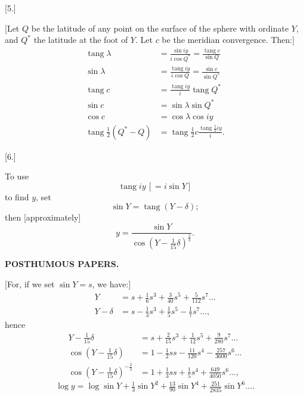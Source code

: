 \begin{center}[5.]\end{center}
[Let \(Q\) be the latitude of any point on the surface of the sphere
with ordinate \(Y\), and \(Q^{*}\) the latitude at the foot of \(Y\).
Let \(c\) be the meridian convergence. Then:]
\[
\begin{aligned}
\operatorname{tang}\lambda&=\frac{\sin iy}{i\cos Q^{*}}=\frac{\operatorname{tang}c}{\sin Q}\\
\sin\lambda&=\frac{\operatorname{tang}iy}{i\cos Q}=\frac{\sin c}{\sin Q^{*}}\\
\operatorname{tang}c&=\frac{\operatorname{tang}iy}{i}\operatorname{tang} Q^{*}\\
\sin c&=\sin\lambda\sin Q^{*}\\
\cos c&=\cos\lambda\cos iy\\
\operatorname{tang}\tfrac12(Q^{*}-Q)&=\operatorname{tang}\tfrac12c
 \frac{\operatorname{tang}\tfrac12iy}{i}.
\end{aligned}
\]

\begin{center}[6.]\end{center}
To use
\[
\operatorname{tang}iy\,[=i\sin Y]
\]
\noindent to find \(y\), set
\[
\sin Y=\operatorname{tang}(Y-\delta);
\]
\noindent then [approximately]
\[
y=\frac{\sin Y}{\cos(Y-\tfrac1{15}\delta)^{\frac23}}.
\]

\par\clearpage
\noindent{}\hfill{\small\textbf{POSTHUMOUS PAPERS.}}\hfill\null\par\medskip

[For, if we set \(\sin Y=s\), we have:]
\[
\begin{aligned}
Y&=s+\tfrac16s^3+\tfrac3{40}s^5+\tfrac5{112}s^7\ldots\\
Y-\delta&=s-\tfrac13s^3+\tfrac15s^5-\tfrac17s^7\ldots,
\end{aligned}
\]
\noindent hence
\[
\begin{aligned}
Y-\tfrac1{15}\delta&=s+\tfrac2{15}s^3+\tfrac1{12}s^5+\tfrac9{280}s^7\ldots\\
\cos(Y-\tfrac1{15}\delta)&=1-\tfrac12ss-\tfrac{11}{120}s^4-\tfrac{257}{3600}s^6\ldots\\
\cos(Y-\tfrac1{15}\delta)^{-\frac23}&=1+\tfrac13ss+\tfrac15s^4+\tfrac{649}{4050}s^6\ldots,
\end{aligned}
\]
\[
\log y=\log\sin Y+\tfrac13\sin Y^2+\tfrac{13}{90}\sin Y^4+
 \tfrac{251}{2835}\sin Y^6\ldots.
\]

